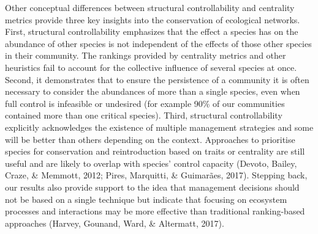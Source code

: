 \documentclass[a4paper]{artikel1}
\newcommand{\R}[1]{\label{#1}\linelabel{#1}}
\theoremstyle{definition}
\theoremstyle{definition}
\theoremstyle{definition}
\theoremstyle{remark}
\begin{document}
Other conceptual differences between structural controllability and
centrality metrics provide three key insights into the conservation of
ecological networks. \R{R2-structural-controllability} First, structural
controllability emphasizes that the effect a species has on the
abundance of other species is not independent of the effects of those
other species in their community. The rankings provided by centrality
metrics and other heuristics fail to account for the collective
influence of several species at once. Second, it demonstrates that to
ensure the persistence of a community it is often necessary to consider
the abundances of more than a single species, even when full control is
infeasible or undesired (for example 90\% of our communities contained
more than one critical species). Third, structural controllability
explicitly acknowledges the existence of multiple management strategies
and some will be better than others depending on the context. Approaches
to prioritise species for conservation and reintroduction based on
traits or centrality are still useful and are likely to overlap with
species' control capacity (Devoto, Bailey, Craze, \& Memmott, 2012;
Pires, Marquitti, \& Guimarães, 2017). Stepping back, our results also
provide support to the idea that management decisions should not be
based on a single technique but indicate that focusing on ecosystem
processes and interactions may be more effective than traditional
ranking-based approaches (Harvey, Gounand, Ward, \& Altermatt, 2017).
\end{document}
